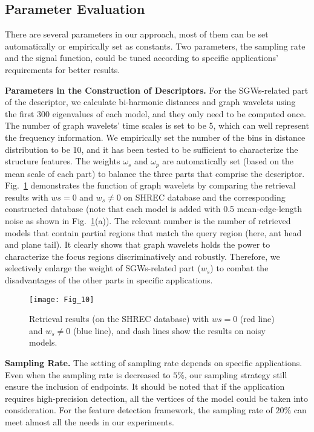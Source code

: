 \subsection{Parameter Evaluation}

There are several parameters in our approach, most of them can be set
automatically or empirically set as constants. Two parameters, the
sampling rate and the signal function, could be tuned according to
specific applications' requirements for better results.

\textbf{Parameters in the Construction of Descriptors.} For the
SGWs-related part of the descriptor, we calculate bi-harmonic
distances and graph wavelets using the first 300 eigenvalues of each
model, and they only need to be computed once. The number of graph
wavelets' time scales is set to be 5, which can well represent the
frequency information. We empirically set the number of the bins in
distance distribution to be 10, and it has been tested to be
sufficient to characterize the structure features. The weights
$\omega_s$ and $\omega_p$ are automatically set (based on the mean
scale of each part) to balance the three parts that comprise the
descriptor. Fig.~\ref{ws} demonstrates the function of graph
wavelets by comparing the retrieval results with $ws = 0$ and
$w_s \neq 0$ on SHREC database and the corresponding constructed
database (note that each model is added with 0.5 mean-edge-length
noise as shown in Fig.~\ref{ws}(a)). The relevant number is the
number of retrieved models that contain partial regions that match
the query region (here, ant head and plane tail). It clearly shows
that graph wavelets holds the power to characterize the focus regions
discriminatively and robustly. Therefore, we selectively enlarge the
weight of SGWs-related part ($w_s$) to combat the disadvantages of
the other parts in specific applications.

\begin{figure}[!to]
\texttt{[image: Fig\_10]}
\caption[Retrieval results on the SHREC database.] 
    {Retrieval results (on the SHREC database) with $ws = 0$ (red line)
    and $w_s \neq 0$ (blue line), and dash lines show the results on
    noisy models.}
\label{ws}
\end{figure}

\textbf{Sampling Rate.} The setting of sampling rate depends on
specific applications. Even when the sampling rate is decreased to
$5\%$, our sampling strategy still ensure the inclusion of endpoints.
It should be noted that if the application requires high-precision
detection, all the vertices of the model could be taken into
consideration. For the feature detection framework, the sampling rate
of $20\%$ can meet almost all the needs in our experiments.

